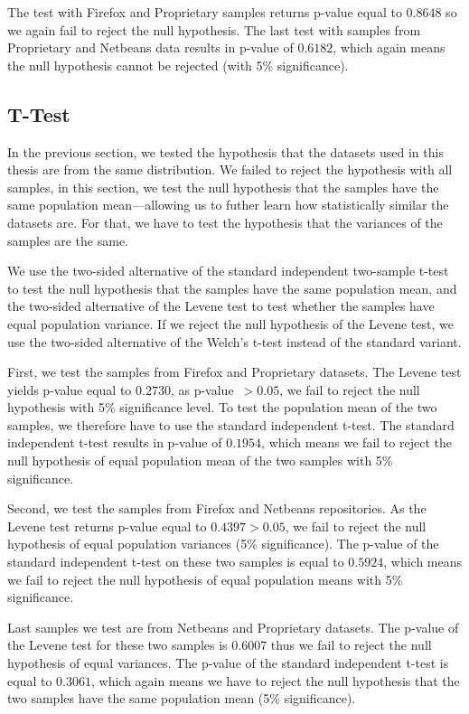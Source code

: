 The test with Firefox and Proprietary samples returns p-value equal to $0.8648$ so we again fail to reject the null hypothesis. The last test with samples from Proprietary and Netbeans data results in p-value of $0.6182$, which again means the null hypothesis cannot be rejected (with 5\% significance).

\subsection{T-Test}

In the previous section, we tested the hypothesis that the datasets used in this thesis are from the same distribution. We failed to reject the hypothesis with all samples, in this section, we test the null hypothesis that the samples have the same population mean---allowing us to futher learn how statistically similar the datasets are. For that, we have to test the hypothesis that the variances of the samples are the same.

We use the two-sided alternative of the standard independent two-sample t-test to test the null hypothesis that the samples have the same population mean, and the two-sided alternative of the Levene test to test whether the samples have equal population variance. If we reject the null hypothesis of the Levene test, we use the two-sided alternative of the Welch's t-test instead of the standard variant.

First, we test the samples from Firefox and Proprietary datasets. The Levene test yields p-value equal to $0.2730$, as p-value~$> 0.05$, we fail to reject the null hypothesis with 5\% significance level. To test the population mean of the two samples, we therefore have to use the standard independent t-test. The standard independent t-test results in p-value of $0.1954$, which means we fail to reject the null hypothesis of equal population mean of the two samples with 5\% significance.

Second, we test the samples from Firefox and Netbeans repositories. As the Levene test returns p-value equal to $0.4397 > 0.05$, we fail to reject the null hypothesis of equal population variances (5\% significance). The p-value of the standard independent t-test on these two samples is equal to $0.5924$, which means we fail to reject the null hypothesis of equal population means with 5\% significance.

Last samples we test are from Netbeans and Proprietary datasets. The p-value of the Levene test for these two samples is $0.6007$ thus we fail to reject the null hypothesis of equal variances. The p-value of the standard independent t-test is equal to $0.3061$, which again means we have to reject the null hypothesis that the two samples have the same population mean (5\% significance).


